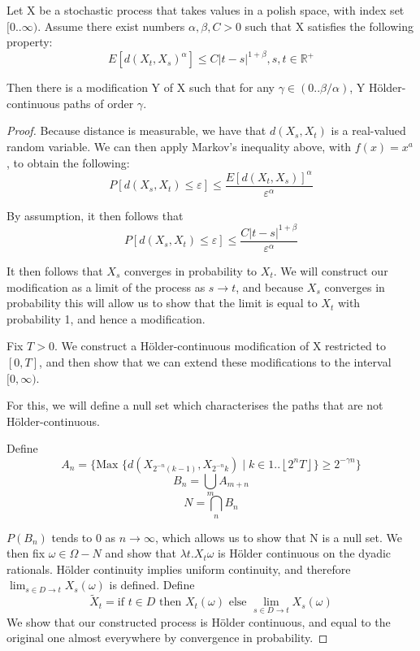 \documentclass[orivec, envcountsame]{llncs}
\begin{document}
 \begin{theorem}
Let X be a stochastic process that takes values in a polish space, with index set \([0..\infty)\). Assume there exist numbers \(\alpha, \beta, C > 0\) such that X satisfies the following property: 
\[E[d(X_t, X_s)^\alpha] \leq C |t - s|^{1+\beta}, s,t \in \mathbb{R}^+\]

Then there is a modification Y of X such that for any \(\gamma \in (0..\beta/\alpha)\), Y H{\"o}lder-continuous paths of order \(\gamma\).
 \end{theorem}
\begin{proof}
Because distance is measurable, we have that \(d(X_s, X_t)\) is a real-valued random variable. We can then apply Markov's inequality above, with \(f(x) = x^a\), to obtain the following:
\[P[d(X_s, X_t) \le \varepsilon] \le \frac{E[d(X_t, X_s)]^\alpha}{\varepsilon^\alpha}\]

By assumption, it then follows that
\[P[d(X_s, X_t) \le \varepsilon] \le \frac{C|t-s|^{1+\beta}}{\varepsilon^\alpha}\]

It then follows that \(X_s\) converges in probability to \(X_t\). We will construct our modification as a limit of the process as \(s \to t\), and because \(X_s\) converges in probability this will allow us to show that the limit is equal to \(X_t\) with probability 1, and hence a modification.

Fix \(T > 0\). We construct a H{\"o}lder-continuous modification of X restricted to \([0, T]\), and then show that we can extend these modifications to the interval \([0, \infty)\).

For this, we will define a null set which characterises the paths that are not H{\"o}lder-continuous.

Define
\[A_n = \{\text{Max } \{d(X_{2^{-n}(k-1)}, X_{2^{-n}k}) \mid k \in 1..\left\lfloor 2^nT\right\rfloor\} \ge 2 ^ {-\gamma n}\}\]
\[B_n = \bigcup_m A_{m+n}\]
\[N = \bigcap_n B_n\]

\(P(B_n)\) tends to 0 as \(n \to \infty\), which allows us to show that N is a null set. We then fix \(\omega \in \Omega - N\) and show that \(\lambda t. X_t \omega\) is H{\"o}lder continuous on the dyadic rationals. H{\"o}lder continuity implies uniform continuity, and therefore \(\lim_{s\in D \to t} X_s(\omega)\) is defined. Define \[\tilde{X}_t = \text{if } t \in D \text{ then } X_t(\omega) \text{ else } \lim_{s\in D \to t} X_s(\omega)\] We show that our constructed process is H{\"o}lder continuous, and equal to the original one almost everywhere by convergence in probability.


\end{proof}
\end{document}
